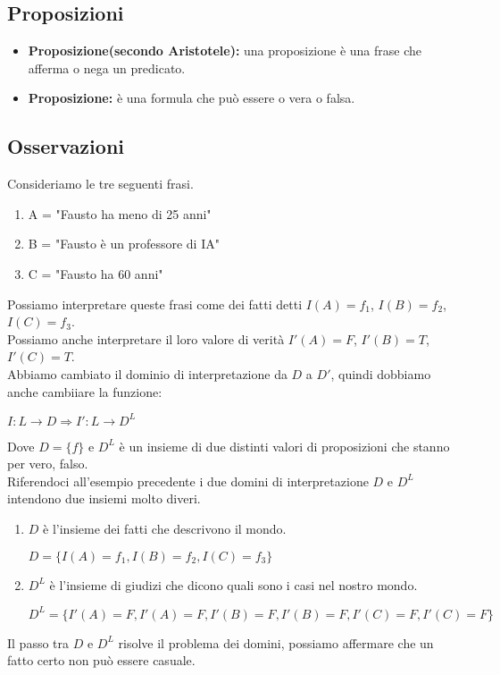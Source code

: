 \documentclass[../main.tex]{subfiles}
\begin{document}
    \subsection{Proposizioni}
    \begin{itemize}
        \item \textbf{Proposizione(secondo Aristotele):} una proposizione è una frase che afferma o nega un predicato.
        \item \textbf{Proposizione:} è una formula che può essere o vera o falsa.
    \end{itemize}

    \subsection{Osservazioni}
    Consideriamo le tre seguenti frasi.
    \begin{enumerate}
        \item A = "Fausto ha meno di 25 anni"
        \item B = "Fausto è un professore di IA"
        \item C = "Fausto ha 60 anni"
    \end{enumerate}
    Possiamo interpretare queste frasi come dei fatti detti $I(A)=f_1$, $I(B)=f_2$, $I(C)=f_3$.\\
    Possiamo anche interpretare il loro valore di verità $I\prime (A)=F$, $I\prime (B)=T$, $I\prime (C)=T$.\\
    Abbiamo cambiato il dominio di interpretazione da $D$ a $D\prime$, quindi dobbiamo anche cambiiare la funzione:
    \begin{center}
        $I:L \to D \Rightarrow I\prime:L \to D^L$
    \end{center}
    Dove $D=\{f\}$ e $D^L$ è un insieme di due distinti valori di proposizioni che stanno per vero, falso.\\
    Riferendoci all'esempio precedente i due domini di interpretazione $D$ e $D^L$ intendono due insiemi molto diveri.
    \begin{enumerate}
        \item $D$ è l'insieme dei fatti che descrivono il mondo.
            \begin{center}
                $D = \{I(A)=f_1, I(B)=f_2, I(C)=f_3\}$
            \end{center}
        \item $D^L$ è l'insieme di giudizi che dicono quali sono i casi nel nostro mondo.
            \begin{center}
                $D^L = \{I\prime(A)=F, I\prime(A)=F, I\prime(B)=F, I\prime(B)=F,I\prime(C)=F, I\prime(C)=F\}$
            \end{center}
    \end{enumerate}
    Il passo tra $D$ e $D^L$ risolve il problema dei domini, possiamo affermare che un fatto certo non può essere casuale.
\end{document}
